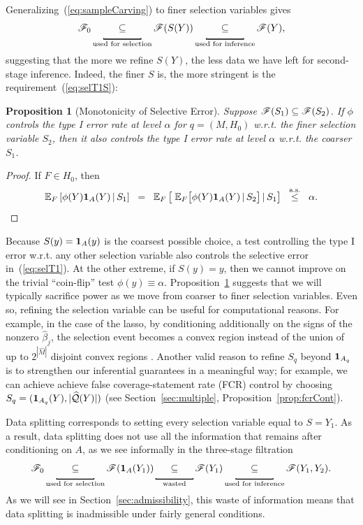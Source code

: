 \documentclass{article}
\newtheorem{proposition}[theorem]{Proposition}
\theoremstyle{definition}
\newcommand{\hcQ}{\widehat{\mathcal{Q}}}
\newcommand{\sF}{\mathscr{F}}
\newcommand{\hM}{\widehat{M}}
\newcommand{\leqAS}{\overset{\textrm{a.s.}}{\leq}}
\newcommand*\mystrut{\vrule width0pt height0pt depth1.5ex\relax}
\newcommand{\underlabel}{\underbracket[1pt][.5pt]{\mystrut \quad\;\; \sub \quad\;\; }}
\newcommand{\sampOrData}{data }
\newcommand{\capSampOrData}{Data }
\begin{document}
Generalizing~(\ref{eq:sampleCarving}) to finer selection variables gives
\begin{equation}\label{eq:sampleCarvingS}
  \sF_0 \underlabel_{\text{used for selection}} \sF(S(Y))
  \underlabel_{\text{used for inference}} \sF(Y),
\end{equation}
suggesting that the more we refine $S(Y)$, the less data we have left for second-stage inference. Indeed, the finer $S$ is, the more stringent is the requirement~(\ref{eq:selT1S}):
\begin{proposition}[Monotonicity of Selective Error]\label{prop:fineCont}
  Suppose $\sF(S_{1}) \sub \sF(S_{2})$. If $\phi$ controls the type I error rate at level $\alpha$ for $q=(M,H_0)$ w.r.t. the finer selection variable $S_{2}$, then it also controls the type I error rate at level $\alpha$ w.r.t. the coarser $S_{1}$.
\end{proposition}
\begin{proof}
If $F\in H_0$, then
\begin{equation*}
  \E_F\left[\phi(Y)\1_{A}(Y) \gv S_{1}\right] \;\;=\;\; \E_F\left[\;\E_F\big[\phi(Y)\1_{A}(Y) \gv S_{2}\big] \gv S_{1}\right] \;\;\leqAS\;\; \alpha.
\end{equation*}
\end{proof}
Because $S(y) = \mathbf{1}_A(y)$ is the coarsest possible choice, a test controlling the type I error w.r.t. any other selection variable also controls the selective error in~(\ref{eq:selT1}). At the other extreme, if $S(y) = y$, then we cannot improve on the trivial ``coin-flip'' test $\phi(y)\equiv \alpha$. Proposition~\ref{prop:fineCont} suggests that we will typically sacrifice power as we move from coarser to finer selection variables.
Even so, refining the selection variable can be useful for computational reasons. For example, in the case of the lasso, by conditioning additionally on the signs of the nonzero $\hat\beta_j$, the selection event becomes a convex region instead of the union of up to $2^{|\hM|}$ disjoint convex regions \citep{lee2016exact}. Another valid reason to refine $S_q$ beyond $\mathbf{1}_{A_q}$ is to strengthen our inferential guarantees in a meaningful way; for example, we can achieve achieve false coverage-statement rate (FCR) control by choosing $S_q=(\1_{A_q}(Y),|\hcQ(Y)|)$ (see Section~\ref{sec:multiple}, Proposition~\ref{prop:fcrCont}).

\capSampOrData splitting corresponds to setting every selection variable equal to $S = Y_{1}$. As a result, \sampOrData splitting does not use all the information that remains after conditioning on $A$, as we see informally in the three-stage filtration
\begin{equation}\label{eq:ssWaste}
  \sF_0 \underlabel_{\text{used for selection}} \sF(\1_{A}(Y_{1}))
  \underlabel_{\text{wasted}} \sF(Y_{1})
  \underlabel_{\text{used for inference}} \sF(Y_{1}, Y_{2}).
\end{equation}
As we will see in Section~\ref{sec:admissibility}, this waste of information means that \sampOrData splitting is inadmissible under fairly general conditions.
\end{document}
